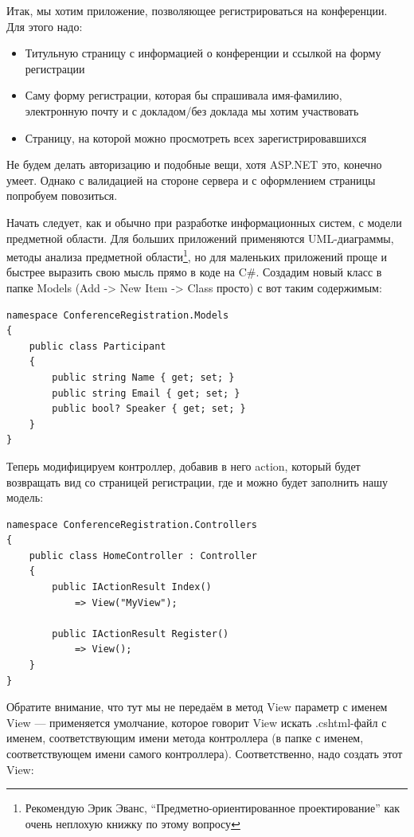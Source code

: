 \documentclass[a5paper]{article}
\begin{document}
Итак, мы хотим приложение, позволяющее регистрироваться на конференции. Для этого надо:
\begin{itemize}
    \item Титульную страницу с информацией о конференции и ссылкой на форму регистрации
    \item Саму форму регистрации, которая бы спрашивала имя-фамилию, электронную почту и с докладом/без доклада мы хотим участвовать
    \item Страницу, на которой можно просмотреть всех зарегистрировавшихся
\end{itemize}

Не будем делать авторизацию и подобные вещи, хотя ASP.NET это, конечно умеет. Однако с валидацией на стороне сервера и с оформлением страницы попробуем повозиться.

Начать следует, как и обычно при разработке информационных систем, с модели предметной области. Для больших приложений применяются UML-диаграммы, методы анализа предметной области\footnote{Рекомендую Эрик Эванс, ``Предметно-ориентированное проектирование'' как очень неплохую книжку по этому вопросу},
но для маленьких приложений проще и быстрее выразить свою мысль прямо в коде на C\#. Создадим новый класс в папке Models (Add -> New Item -> Class просто) с вот таким содержимым:

\begin{verbatim}
namespace ConferenceRegistration.Models
{
    public class Participant
    {
        public string Name { get; set; }
        public string Email { get; set; }
        public bool? Speaker { get; set; }
    }
}
\end{verbatim}

Теперь модифицируем контроллер, добавив в него action, который будет возвращать вид со страницей регистрации, где и можно будет заполнить нашу модель:

\begin{verbatim}
namespace ConferenceRegistration.Controllers
{
    public class HomeController : Controller
    {
        public IActionResult Index()
            => View("MyView");

        public IActionResult Register()
            => View();
    }
}
\end{verbatim}

Обратите внимание, что тут мы не передаём в метод View параметр с именем View --- применяется умолчание, которое говорит View искать .cshtml-файл с именем, соответствующим имени метода контроллера (в папке с именем, соответствующем имени самого контроллера).
Соответственно, надо создать этот View:
\end{document}
